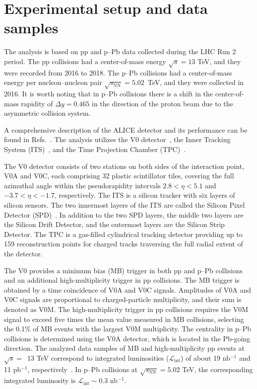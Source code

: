 

\section{Experimental setup and data samples}
\label{sec:experiment}

The analysis is based on pp and p--Pb data collected during the LHC Run 2 period. The pp collisions had a center-of-mass energy $\sqrt{s} = 13$ TeV, and they were recorded from 2016 to 2018.
The p--Pb collisions had a center-of-mass energy per nucleon--nucleon pair $\sqrt{s_\mathrm{NN}} = 5.02$~TeV, and they were collected in 2016. It is worth noting that in p--Pb collisions there is a shift in the center-of-mass rapidity of $\Delta y = 0.465$ in the direction of the proton beam due to the asymmetric collision system.

A comprehensive description of the ALICE detector and its performance can be found in Refs.~\cite{Aamodt:2008zz, Abelev:2014ffa, ALICE:2022wpn}. The analysis utilizes the V0 detector~\cite{Abbas:2013taa}, the Inner Tracking System (ITS)~\cite{aliceITS, ALICE:2013nwm}, and the Time Projection Chamber (TPC)~\cite{aliceTPC}. 

The V0 detector consists of two stations on both sides of the interaction point, V0A and V0C, each comprising 32 plastic scintillator tiles, covering the full azimuthal angle within the pseudorapidity intervals $2.8 < \eta < 5.1$ and $-3.7 < \eta < -1.7$, respectively. 
The ITS is a silicon tracker with six layers of silicon sensors. The two innermost layers of the ITS are called the Silicon Pixel Detector (SPD)~\cite{Santoro2009:ALICESPD}. In addition to the two SPD layers, the middle two layers are the Silicon Drift Detector, and the outermost layers are the Silicon Strip Detector. The TPC is a gas-filled cylindrical tracking detector providing up to 159 reconstruction points for charged tracks traversing the full radial extent of the detector.

The V0 provides a minimum bias (MB) trigger in both pp and p--Pb collisions and an additional high-multiplicity trigger in pp collisions. The MB trigger is obtained by a time coincidence of V0A and V0C signals. 
Amplitudes of V0A and V0C signals are proportional to charged-particle multiplicity, and their sum is denoted as V0M.  
The high-multiplicity trigger in pp collisions requires the V0M signal to exceed five times the mean value measured in MB collisions, selecting the 0.1\% of MB events with the largest V0M multiplicity. The centrality in p--Pb collisions is determined using the V0A detector, which is located in the Pb-going direction. The analyzed data samples of MB and high-multiplicity pp events at $\sqrt{s}=$~13 TeV correspond to integrated luminosities ($\mathcal{L}_\mathrm{int}$) of about 19 nb$^{-1}$ and 11 pb$^{-1}$, respectively~\cite{ALICE-PUBLIC-2016-002}. In p--Pb collisions at $\sqrt{s_\mathrm{NN}} = 5.02$ TeV, the corresponding integrated luminosity is $\mathcal{L}_\mathrm{int} \sim 0.3$ nb$^{-1}$. 


